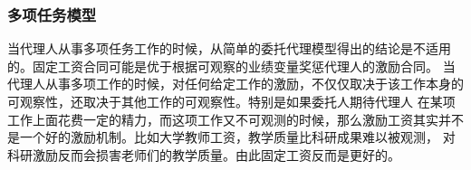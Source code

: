 \documentclass[12pt, a4paper]{article} %
\begin{document}
\begin{CJK*}{UTF8}{gbsn}
            \subsubsection{多项任务模型}
            当代理人从事多项任务工作的时候，从简单的委托代理模型得出的结论是不适用的。固定工资合同可能是优于根据可观察的业绩变量奖惩代理人的激励合同。
            当代理人从事多项工作的时候，对任何给定工作的激励，不仅仅取决于该工作本身的可观察性，还取决于其他工作的可观察性。特别是如果委托人期待代理人
            在某项工作上面花费一定的精力，而这项工作又不可观测的时候，那么激励工资其实并不是一个好的激励机制。比如大学教师工资，教学质量比科研成果难以被观测，
            对科研激励反而会损害老师们的教学质量。由此固定工资反而是更好的。





    \end{CJK*}
\end{document}
